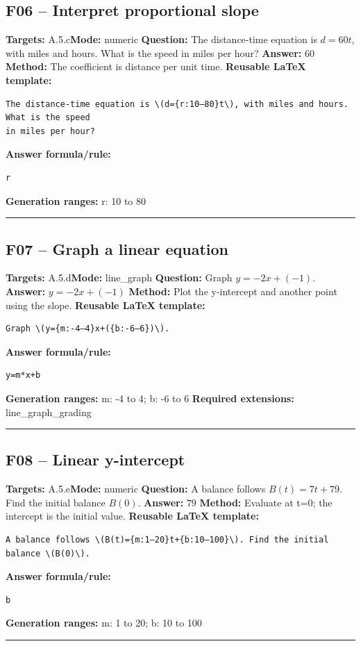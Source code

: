 \documentclass[11pt]{article}
\begin{document}
\subsection{F06 -- Interpret proportional slope}
\textbf{Targets:} A.5.c\quad\textbf{Mode:} numeric
\textbf{Question:} The distance-time equation is \(d=60t\), with miles and hours. What is the speed in miles per hour?
\textbf{Answer:} \(60\)
\textbf{Method:} The coefficient is distance per unit time.
\textbf{Reusable LaTeX template:}
\begin{verbatim}
The distance-time equation is \(d={r:10–80}t\), with miles and hours. What is the speed
in miles per hour?
\end{verbatim}
\textbf{Answer formula/rule:}
\begin{verbatim}
r
\end{verbatim}
\textbf{Generation ranges:} r: 10 to 80
\medskip\hrule\medskip
\subsection{F07 -- Graph a linear equation}
\textbf{Targets:} A.5.d\quad\textbf{Mode:} line\_graph
\textbf{Question:} Graph \(y=-2x+(-1)\).
\textbf{Answer:} \(y=-2x+(-1)\)
\textbf{Method:} Plot the y-intercept and another point using the slope.
\textbf{Reusable LaTeX template:}
\begin{verbatim}
Graph \(y={m:-4–4}x+({b:-6–6})\).
\end{verbatim}
\textbf{Answer formula/rule:}
\begin{verbatim}
y=m*x+b
\end{verbatim}
\textbf{Generation ranges:} m: -4 to 4; b: -6 to 6
\textbf{Required extensions:} line\_graph\_grading
\medskip\hrule\medskip
\subsection{F08 -- Linear y-intercept}
\textbf{Targets:} A.5.e\quad\textbf{Mode:} numeric
\textbf{Question:} A balance follows \(B(t)=7t+79\). Find the initial balance \(B(0)\).
\textbf{Answer:} \(79\)
\textbf{Method:} Evaluate at t=0; the intercept is the initial value.
\textbf{Reusable LaTeX template:}
\begin{verbatim}
A balance follows \(B(t)={m:1–20}t+{b:10–100}\). Find the initial balance \(B(0)\).
\end{verbatim}
\textbf{Answer formula/rule:}
\begin{verbatim}
b
\end{verbatim}
\textbf{Generation ranges:} m: 1 to 20; b: 10 to 100
\medskip\hrule\medskip
\end{document}
